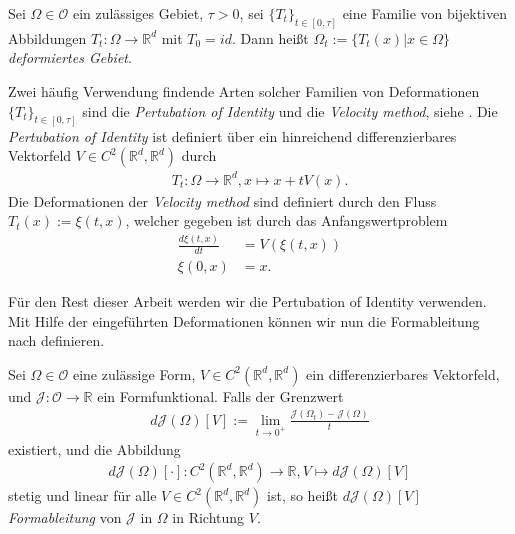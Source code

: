 \begin{defi}
Sei $\Omega\in\mathcal{O}$ ein zulässiges Gebiet, $\tau > 0$, sei $\{T_t\}_{t\in [0,\tau]}$ eine Familie von bijektiven Abbildungen $T_t: \Omega \rightarrow \mathbb{R}^d$ mit $T_0 = id$. Dann heißt $\Omega_t := \{T_t(x) \vert x\in\Omega\}$ \textit{deformiertes Gebiet}.
\end{defi}

Zwei häufig Verwendung findende Arten solcher Familien von Deformationen $\{T_t\}_{t\in [0,\tau]}$ sind die \textit{Pertubation of Identity} und die \textit{Velocity method}, siehe \cite{bfgs2}. Die \textit{Pertubation of Identity} ist definiert über ein hinreichend differenzierbares Vektorfeld $V \in C^2(\mathbb{R}^d,\mathbb{R}^d)$ durch
\begin{align*}
	T_t: \Omega \rightarrow \mathbb{R}^d, x \mapsto x + tV(x).
\end{align*}
Die Deformationen der \textit{Velocity method} sind definiert durch den Fluss $T_t(x) := \xi(t,x)$, welcher gegeben ist durch das Anfangswertproblem
\begin{align*}
	\frac{d\xi(t,x)}{dt} &= V(\xi(t,x))\\
	\xi(0,x) 		&= x.
\end{align*}

Für den Rest dieser Arbeit werden wir die Pertubation of Identity verwenden. Mit Hilfe der eingeführten Deformationen können wir nun die Formableitung nach \cite{bfgs2} definieren. 

\begin{defi}[Formableitung]
Sei $\Omega \in \mathcal{O}$ eine zulässige Form, $V\in C^2(\mathbb{R}^d,\mathbb{R}^d)$ ein differenzierbares Vektorfeld, und $\mathcal{J}: \mathcal{O} \rightarrow \mathbb{R}$ ein Formfunktional. Falls der Grenzwert
\begin{align*}
	d\mathcal{J}(\Omega)[V] := \underset{t \rightarrow 0^+}{\lim}
	\frac{\mathcal{J}(\Omega_t) - \mathcal{J}(\Omega)}{t}
\end{align*}
existiert, und die Abbildung 
\begin{align*}
	d\mathcal{J}(\Omega)[\cdot]: C^2(\mathbb{R}^d,\mathbb{R}^d) \rightarrow 						\mathbb{R}, V \mapsto d\mathcal{J}(\Omega)[V]
\end{align*}
stetig und linear für alle $V \in C^2(\mathbb{R}^d,\mathbb{R}^d)$ ist, so heißt $d\mathcal{J}(\Omega)[V]$ \textit{Formableitung} von $\mathcal{J}$ in $\Omega$ in Richtung $V$.
\end{defi}

